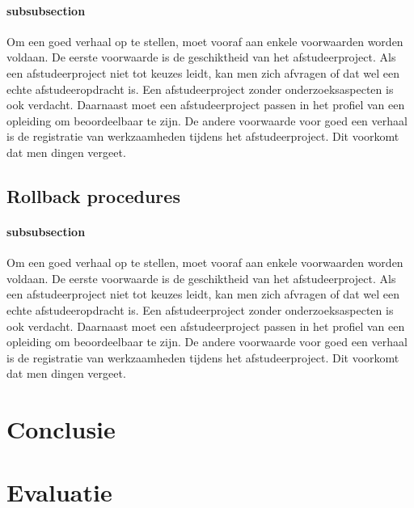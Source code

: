 		\subsubsection{subsubsection}
		
		Om een goed verhaal op te stellen, moet vooraf aan enkele voorwaarden
		worden voldaan. De eerste voorwaarde is de geschiktheid van het
		afstudeerproject. Als een afstudeerproject niet tot keuzes leidt, kan
		men zich afvragen of dat wel een echte afstudeeropdracht is. Een
		afstudeerproject zonder onderzoeksaspecten is ook verdacht. Daarnaast
		moet een afstudeerproject passen in het profiel van een opleiding om
		beoordeelbaar te zijn. De andere voorwaarde voor goed een verhaal is
		de registratie van werkzaamheden tijdens het afstudeerproject. Dit
		voorkomt dat men dingen vergeet.
		\section{Rollback procedures}
		\subsubsection{subsubsection}
		
		Om een goed verhaal op te stellen, moet vooraf aan enkele voorwaarden
		worden voldaan. De eerste voorwaarde is de geschiktheid van het
		afstudeerproject. Als een afstudeerproject niet tot keuzes leidt, kan
		men zich afvragen of dat wel een echte afstudeeropdracht is. Een
		afstudeerproject zonder onderzoeksaspecten is ook verdacht. Daarnaast
		moet een afstudeerproject passen in het profiel van een opleiding om
		beoordeelbaar te zijn. De andere voorwaarde voor goed een verhaal is
		de registratie van werkzaamheden tijdens het afstudeerproject. Dit
		voorkomt dat men dingen vergeet.
		
		
		
		\begin{center}
		\end{center}
	
	
	\chapter{Conclusie}
		
		\chapter{Evaluatie}
		
